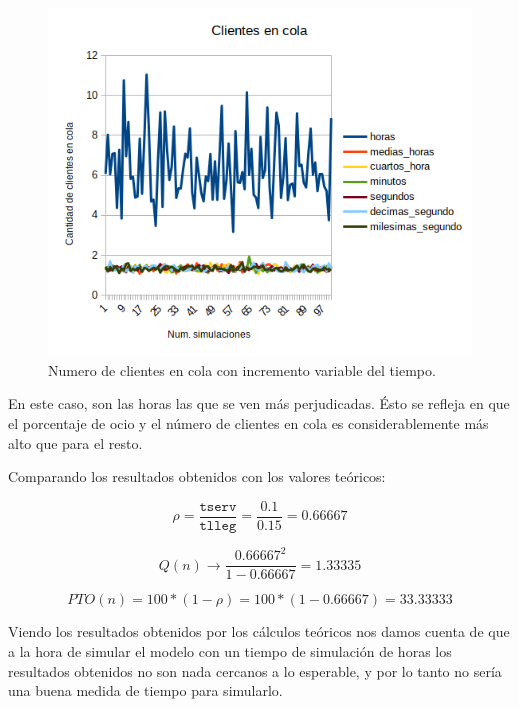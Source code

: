 \documentclass[11pt,a4paper]{report}
\begin{document}
\begin{figure}[H]
    \includegraphics[width=\textwidth]{img/cap-1/tiempo_medio_en_cola_variable.png}
  	\caption{Numero de clientes en cola con incremento variable del tiempo.}
\end{figure}

En este caso, son las horas las que se ven más perjudicadas. Ésto se refleja en que el porcentaje de ocio y el número de clientes en cola es considerablemente más alto que para el resto.

Comparando los resultados obtenidos con los valores teóricos:

\begin{equation}
	\rho = \frac{\texttt{tserv}}{\texttt{tlleg}} = \frac{0.1}{0.15} = 0.66667
\end{equation}

\begin{equation}
	Q(n) \rightarrow \frac{0.66667^2}{1-0.66667} = 1.33335
\end{equation}

\begin{equation}
	PTO(n) = 100*(1-\rho) = 100*(1-0.66667) = 33.33333
\end{equation}


\newpage
Viendo los resultados obtenidos por los cálculos teóricos nos damos cuenta de que a la hora de simular el modelo con un tiempo de simulación de horas los resultados obtenidos no son nada cercanos a lo esperable, y por lo tanto no sería una buena medida de tiempo para simularlo.
\end{document}
